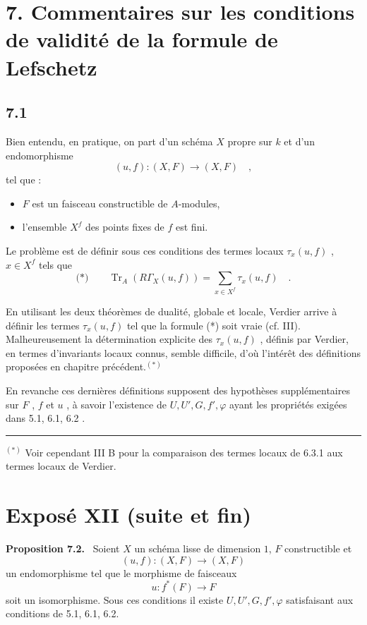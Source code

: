 \documentclass[11pt]{article}
\newenvironment{statement}[1]{\par\medskip\noindent\textbf{#1.}\ }{\par\medskip}
\providecommand{\Tr}{\operatorname{Tr}}
\providecommand{\Tr}{\operatorname{Tr}}
\providecommand{\Tr}{\operatorname{Tr}}
\providecommand{\Tr}{\operatorname{Tr}}
\providecommand{\Tr}{\operatorname{Tr}}
\begin{document}
\section*{7. Commentaires sur les conditions de validité de la formule de Lefschetz}

\subsection*{7.1}
Bien entendu, en pratique, on part d'un schéma $X$ propre sur $k$ et d'un endomorphisme
\[
(u, f) : (X, F) \longrightarrow (X, F) \quad ,
\]
tel que :
\begin{itemize}
\item $F$ est un faisceau constructible de $A$-modules,
\item l'ensemble $X^f$ des points fixes de $f$ est fini.
\end{itemize}

Le problème est de définir sous ces conditions des termes locaux $\tau_x(u, f)$ , $x \in X^f$ tels que
\[
\text{(*)} \qquad \Tr_A(R\Gamma_X(u, f)) = \sum_{x \in X^f} \tau_x(u, f) \quad .
\]

En utilisant les deux théorèmes de dualité, globale et locale, Verdier arrive à définir les termes $\tau_x(u, f)$ tel que la formule (*) soit vraie (cf. III). Malheureusement la détermination explicite des $\tau_x(u, f)$ , définis par Verdier, en termes d'invariants locaux connus, semble difficile, d'où l'intérêt des définitions proposées en chapitre précédent.$^{(*)}$

En revanche ces dernières définitions supposent des hypothèses supplémentaires sur $F$ , $f$ et $u$ , à savoir l'existence de $U, U', G, f', \varphi$ ayant les propriétés exigées dans 5.1, 6.1, 6.2 .

\bigskip
\noindent
\rule{6cm}{0.4pt}

$^{(*)}$ Voir cependant III B pour la comparaison des termes locaux de 6.3.1 aux termes locaux de Verdier.


\section*{Exposé XII (suite et fin)}

\begin{statement}{Proposition 7.2}
Soient $X$ un schéma lisse de dimension $1$, $F$ constructible et
\[
(u,f):(X,F)\longrightarrow (X,F)
\]
un endomorphisme tel que le morphisme de faisceaux
\[
u:f^*(F)\longrightarrow F
\]
soit un isomorphisme. Sous ces conditions il existe $U,U',G,f',\varphi$ satisfaisant aux conditions de 5.1, 6.1, 6.2.
\end{statement}
\end{document}
